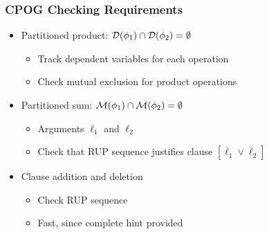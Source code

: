\documentclass[t,pdf]{beamer}
\newcommand{\oneg}[1]{\overline{#1}}
\newcommand{\lit}{\ell}
\newcommand{\bitem}{\item[$\bullet$]}
\begin{document}
\begin{frame}
  \frametitle{CPOG Checking Requirements}

\bigskip

  \begin{itemize}
  \item Partitioned product: ${\cal D}(\phi_1) \cap {\cal D}(\phi_2) = \emptyset$
    \begin{itemize}
    \bitem Track dependent variables for each operation
    \bitem Check mutual exclusion for product operations
    \end{itemize}
\medskip
  \item Partitioned sum: ${\cal M}(\phi_1) \cap {\cal M}(\phi_2) = \emptyset$
    \begin{itemize}
    \bitem Arguments $\lit_1$ and $\lit_2$
    \bitem Check that RUP sequence justifies clause $[\oneg{\lit}_1 \lor \oneg{\lit}_2]$
    \end{itemize}
\medskip
  \item Clause addition and deletion
    \begin{itemize}
      \bitem Check  RUP sequence 
      \bitem Fast, since complete hint provided  
    \end{itemize}
  \end{itemize}

\end{frame}
\end{document}
